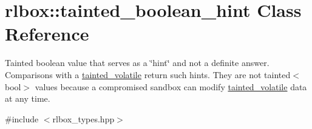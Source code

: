\hypertarget{classrlbox_1_1tainted__boolean__hint}{}\section{rlbox\+:\+:tainted\+\_\+boolean\+\_\+hint Class Reference}
\label{classrlbox_1_1tainted__boolean__hint}


Tainted boolean value that serves as a \char`\"{}hint\char`\"{} and not a definite answer. Comparisons with a \hyperlink{classrlbox_1_1tainted__volatile}{tainted\+\_\+volatile} return such hints. They are not {\ttfamily tainted$<$bool$>$} values because a compromised sandbox can modify \hyperlink{classrlbox_1_1tainted__volatile}{tainted\+\_\+volatile} data at any time.  




{\ttfamily \#include $<$rlbox\+\_\+types.\+hpp$>$}

